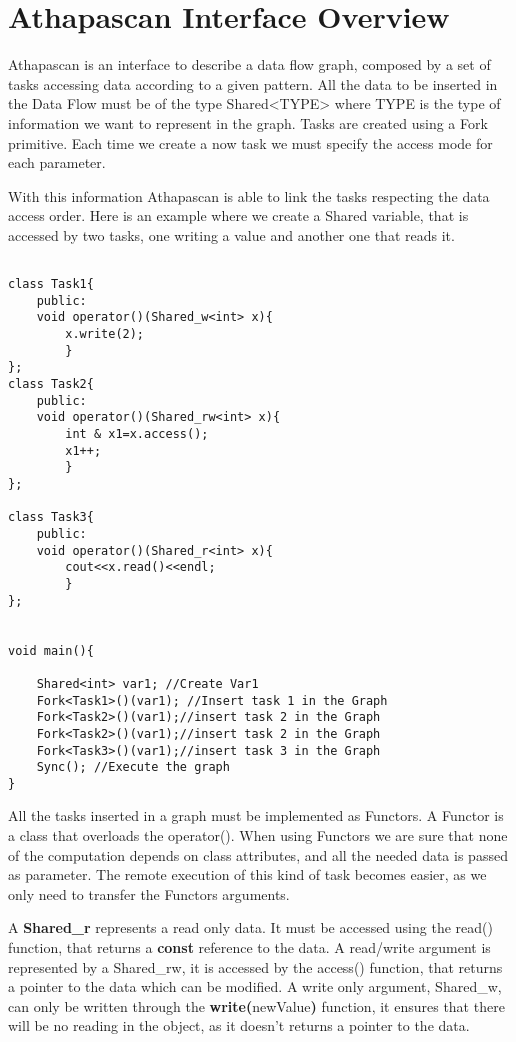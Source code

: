 \section{Athapascan Interface Overview}
Athapascan is an interface to describe a data flow graph, composed by a set of tasks accessing data according to a given pattern. 
All the data to be inserted in the Data Flow must be of the type Shared<TYPE> where TYPE is the type of information we want to represent in the graph.
Tasks are created using a Fork primitive. Each time we create a now task we must specify the access mode for each parameter.

With this information Athapascan is able to link the tasks respecting the data access order.
Here is an example where we create a Shared variable, that is accessed by two tasks, one writing a value and another one that reads it.
\begin{verbatim}

class Task1{
	public:	
	void operator()(Shared_w<int> x){
		x.write(2);
		}
};
class Task2{
	public:	
	void operator()(Shared_rw<int> x){
		int & x1=x.access();
		x1++;
		}
};

class Task3{
	public:
	void operator()(Shared_r<int> x){
	    cout<<x.read()<<endl;
	    }
};


void main(){

	Shared<int> var1; //Create Var1
	Fork<Task1>()(var1); //Insert task 1 in the Graph
	Fork<Task2>()(var1);//insert task 2 in the Graph
	Fork<Task2>()(var1);//insert task 2 in the Graph
	Fork<Task3>()(var1);//insert task 3 in the Graph
	Sync(); //Execute the graph
}
\end{verbatim}

All the tasks inserted in a graph must be implemented as Functors. A Functor is a class that overloads the  operator(). When using Functors we are sure that none of the computation depends on class attributes, and all the  needed data is passed as parameter. The remote execution of this kind of task becomes easier, as we only need to transfer the Functors arguments.

A \textbf{ Shared\_r} represents a read only data. It must be accessed using the read() function, that returns a \textbf{const} reference to the data. A read/write argument is represented by a Shared\_rw, it is accessed by the access() function, that returns a pointer to the data which can be modified. A write only argument, Shared\_w, can only be written through the \textbf{write(}newValue\textbf{)} function, it ensures that there will be no reading in the object, as it doesn't returns a pointer to the data. 

